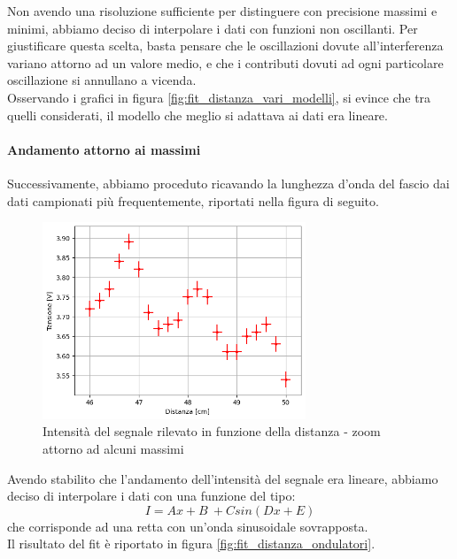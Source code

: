 \documentclass[letterpaper,12pt]{article}
\begin{document}
Non avendo una risoluzione sufficiente per distinguere con precisione massimi e minimi, abbiamo deciso di interpolare
i dati con funzioni non oscillanti. Per giustificare questa scelta, basta pensare che le oscillazioni dovute all'interferenza
variano attorno ad un valore medio, e che i contributi dovuti ad ogni particolare oscillazione si annullano a vicenda.\\
Osservando i grafici in figura \ref{fig:fit_distanza_vari_modelli}, si evince che tra quelli considerati, il modello che meglio si adattava 
ai dati era lineare.
\newpage
\paragraph*{Andamento attorno ai massimi}
Successivamente, abbiamo proceduto ricavando la lunghezza d'onda del fascio dai dati campionati più frequentemente, riportati nella figura di seguito.

\begin{figure}[h!]
    \centering
    \includegraphics[width = 0.7\textwidth]{dati_distanza_ondulatori.png}
    \caption{Intensità del segnale rilevato in funzione della distanza - zoom attorno ad alcuni massimi}
    \label{fig:distanza_zoom}
\end{figure}

Avendo stabilito che l'andamento dell'intensità del segnale era lineare, abbiamo deciso di interpolare i dati con una funzione del tipo:
\begin{equation}
    I = Ax + B\ + Csin(Dx + E)
    \label{eq:modello_oscillante}
\end{equation}
che corrisponde ad una retta con un'onda sinusoidale sovrapposta.\\
Il risultato del fit è riportato in figura \ref{fig:fit_distanza_ondulatori}.
\end{document}
